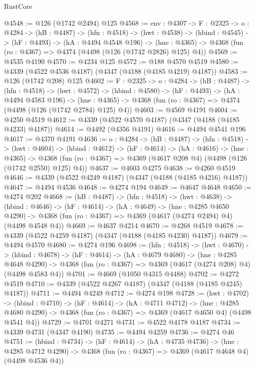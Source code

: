 \begin{lexlean}{RustCore}
\begin{coremodule}
@4548 := @126 (@1742 @2494) @125
@4568 := {env : @4307} ->
  {F : @2325} ->
  {o : @4284} ->
  (hB : @4487) ->
  (hfn : @4518) ->
  (hwt : @4538) ->
  (hbind : @4545) ->
  (hF : @4493) ->
  (hA : @4494 @4548 @196) ->
  (hne : @4365) -> @4368 (fun (ro : @4367) => @4374 (@4498 (@126 (@1742 @2826) @125) @4))
@4569 := @4535 @4190
@4570 := @4234 @125
@4572 := @188 @4570 @4519
@4580 := @4339 (@4522 @4536 @4187) (@4347 (@4188 (@4185 @4219) @4187))
@4583 := @126 (@1742 @208) @125
@4602 := {F : @2325} ->
  {o : @4284} ->
  (hB : @4487) ->
  (hfn : @4518) ->
  (hwt : @4572) ->
  (hbind : @4580) ->
  (hF : @4493) ->
  (hA : @4494 @4583 @196) ->
  (hne : @4365) -> @4368 (fun (ro : @4367) => @4374 (@4498 (@126 (@1742 @2784) @125) @4))
@4603 := @4569 @4191
@4604 := @4250 @4519
@4612 := @4339 (@4522 @4570 @4187) (@4347 (@4188 (@4185 @4233) @4187))
@4614 := @4492 (@4356 @4191)
@4616 := @4494 @4541 @196
@4617 := @4370 @4191
@4636 := {o : @4284} ->
  (hB : @4487) ->
  (hfn : @4518) ->
  (hwt : @4604) ->
  (hbind : @4612) ->
  (hF : @4614) ->
  (hA : @4616) ->
  (hne : @4365) ->
  @4368 (fun (ro : @4367) => @4369 (@4617 @208 @4) (@4498 (@126 (@1742 @2550) @125) @4))
@4637 := @4603 @4275
@4638 := @4260 @4519
@4646 := @4339 (@4522 @4249 @4187) (@4347 (@4188 (@4185 @4216) @4187))
@4647 := @4494 @4536
@4648 := @4274 @194
@4649 := @4647 @4648
@4650 := @4274 @202
@4668 := (hB : @4487) ->
  (hfn : @4518) ->
  (hwt : @4638) ->
  (hbind : @4646) ->
  (hF : @4614) ->
  (hA : @4649) ->
  (hne : @4285 @4650 @4290) ->
  @4368 (fun (ro : @4367) => @4369 (@4617 (@4274 @2494) @4) (@4498 @4548 @4))
@4669 := @4637 @4214
@4670 := @4268 @4519
@4678 := @4339 (@4522 @4259 @4187) (@4347 (@4188 (@4185 @4230) @4187))
@4679 := @4494 @4570
@4680 := @4274 @196
@4698 := (hfn : @4518) ->
  (hwt : @4670) ->
  (hbind : @4678) ->
  (hF : @4614) ->
  (hA : @4679 @4680) ->
  (hne : @4285 @4648 @4290) ->
  @4368 (fun (ro : @4367) => @4369 (@4617 (@4274 @208) @4) (@4498 @4583 @4))
@4701 := @4669 (@1050 @4315 @4488)
@4702 := @4272 @4519
@4710 := @4339 (@4522 @4267 @4187) (@4347 (@4188 (@4185 @4245) @4187))
@4711 := @4494 @4249
@4712 := @4274 @198
@4728 := (hwt : @4702) ->
  (hbind : @4710) ->
  (hF : @4614) ->
  (hA : @4711 @4712) ->
  (hne : @4285 @4680 @4290) -> @4368 (fun (ro : @4367) => @4369 (@4617 @4650 @4) (@4498 @4541 @4))
@4729 := @4701 @4271
@4731 := @4522 @4178 @4187
@4734 := @4339 @4731 (@4347 @4190)
@4735 := @4494 @4259
@4736 := @4274 @46
@4751 := (hbind : @4734) ->
  (hF : @4614) ->
  (hA : @4735 @4736) ->
  (hne : @4285 @4712 @4290) -> @4368 (fun (ro : @4367) => @4369 (@4617 @4648 @4) (@4498 @4536 @4))

\end{coremodule}
\end{lexlean}
